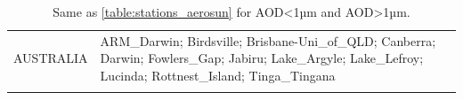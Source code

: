 \documentclass[journal abbreviation, manuscript]{copernicus}
\begin{document}
\begin{table}
\begin{tabularx}{\textwidth}{lX}
  AUSTRALIA & ARM\_Darwin; Birdsville; Brisbane-Uni\_of\_QLD; Canberra; Darwin; Fowlers\_Gap; Jabiru; Lake\_Argyle; Lake\_Lefroy; Lucinda; Rottnest\_Island; Tinga\_Tingana                                                                                                                                                                                                                                                                                                                                                                                                                                                                                                                                                                                                                                                                                                                                                                                                                                                                                                                                                                                                                                                                                                                                                                                                                                                                                                                                                                                           \\
  \bottomhline
 \end{tabularx}
 \caption{Same as \ref{table:stations_aerosun} for AOD<1µm and AOD>1µm.}
 \label{table:stations_aerosda}
\end{table}

\clearpage
\end{document}

